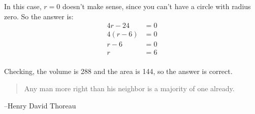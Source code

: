 \documentclass[letterpaper]{exam}
\begin{document}
\begin{description}
      In this case, $r = 0$ doesn't make sense, since you can't have a circle with radius zero.  So the answer is:
      \begin{align*}
        4r - 24 &= 0 \\
        4(r - 6) &= 0 \\
        r - 6 &= 0 \\
        r &= 6 \\
      \end{align*}

      Checking, the volume is 288 and the area is 144, so the answer is correct.

    \end{description}
  \fi
  \ifprintanswers{}
  \else
    \vspace{11 cm}
    \begin{quote}
      \begin{em}
        Any man more right than his neighbor is a majority of one already.
      \end{em}
    \end{quote}
    \hspace{2 cm}--Henry David Thoreau
  \fi
\end{document}
